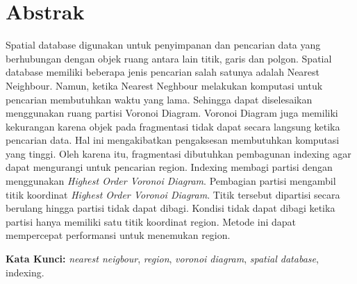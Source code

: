 \chapter*{Abstrak}

Spatial database digunakan untuk penyimpanan dan pencarian data yang berhubungan dengan objek ruang antara lain titik, garis dan polgon. Spatial database memiliki beberapa jenis pencarian salah satunya adalah Nearest Neighbour. Namun, ketika Nearest Neghbour melakukan komputasi untuk pencarian membutuhkan waktu yang lama. Sehingga dapat diselesaikan menggunakan ruang partisi Voronoi Diagram. Voronoi Diagram juga memiliki kekurangan karena objek pada fragmentasi tidak dapat secara langsung ketika pencarian data. Hal ini mengakibatkan pengaksesan membutuhkan komputasi yang tinggi. Oleh karena itu, fragmentasi dibutuhkan pembagunan indexing agar dapat mengurangi untuk pencarian region. Indexing membagi partisi dengan menggunakan \textit{Highest Order Voronoi Diagram}. Pembagian partisi mengambil titik koordinat \textit{Highest Order Voronoi Diagram}. Titik tersebut dipartisi secara berulang hingga partisi tidak dapat dibagi. Kondisi tidak dapat dibagi ketika partisi hanya memiliki satu titik koordinat region. Metode ini dapat mempercepat performansi untuk menemukan region.
  
\vspace{0.5 cm}
\begin{flushleft}
{\textbf{Kata Kunci:} \textit{nearest neigbour}, \textit{region}, \textit{voronoi diagram}, \textit{spatial database}, indexing.}
\end{flushleft}